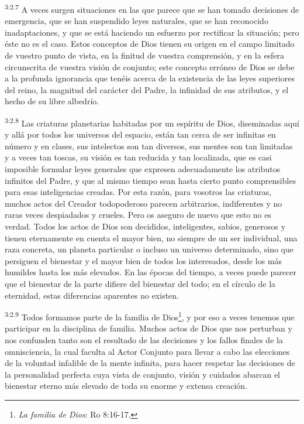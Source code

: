 \par
\textsuperscript{3:2.7} A veces surgen situaciones en las que parece que se han tomado decisiones de emergencia, que se han suspendido leyes naturales, que se han reconocido inadaptaciones, y que se está haciendo un esfuerzo por rectificar la situación; pero éste no es el caso. Estos conceptos de Dios tienen su origen en el campo limitado de vuestro punto de vista, en la finitud de vuestra comprensión, y en la esfera circunscrita de vuestra visión de conjunto; este concepto erróneo de Dios se debe a la profunda ignorancia que tenéis acerca de la existencia de las leyes superiores del reino, la magnitud del carácter del Padre, la infinidad de sus atributos, y el hecho de su libre albedrío.

\par
\textsuperscript{3:2.8} Las criaturas planetarias habitadas por un espíritu de Dios, diseminadas aquí y allá por todos los universos del espacio, están tan cerca de ser infinitas en número y en clases, sus intelectos son tan diversos, sus mentes son tan limitadas y a veces tan toscas, su visión es tan reducida y tan localizada, que es casi imposible formular leyes generales que expresen adecuadamente los atributos infinitos del Padre, y que al mismo tiempo sean hasta cierto punto comprensibles para esas inteligencias creadas. Por esta razón, para vosotros las criaturas, muchos actos del Creador todopoderoso parecen arbitrarios, indiferentes y no raras veces despiadados y crueles. Pero os aseguro de nuevo que esto no es verdad. Todos los actos de Dios son decididos, inteligentes, sabios, generosos y tienen eternamente en cuenta el mayor bien, no siempre de un ser individual, una raza concreta, un planeta particular o incluso un universo determinado, sino que persiguen el bienestar y el mayor bien de todos los interesados, desde los más humildes hasta los más elevados. En las épocas del tiempo, a veces puede parecer que el bienestar de la parte difiere del bienestar del todo; en el círculo de la eternidad, estas diferencias aparentes no existen.

\par
\textsuperscript{3:2.9} Todos formamos parte de la familia de Dios\footnote{\textit{La familia de Dios}: Ro 8:16-17.}, y por eso a veces tenemos que participar en la disciplina de familia. Muchos actos de Dios que nos perturban y nos confunden tanto son el resultado de las decisiones y los fallos finales de la omnisciencia, la cual faculta al Actor Conjunto para llevar a cabo las elecciones de la voluntad infalible de la mente infinita, para hacer respetar las decisiones de la personalidad perfecta cuya vista de conjunto, visión y cuidados abarcan el bienestar eterno más elevado de toda su enorme y extensa creación.

